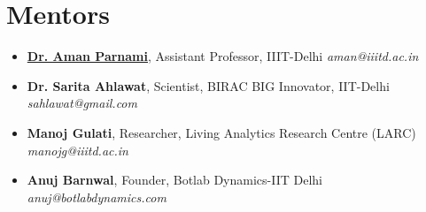 \documentclass[10pt]{report}
\begin{document}
\section*{\color{BlueViolet}\faUsers\hspace{1pt} Mentors}
\begin{itemize}
\vspace{-1em}\item\href{http://amanparnami.com/}{\color{black}\textbf{Dr. Aman Parnami}}, Assistant Professor, IIIT-Delhi
\hfill\textit{aman@iiitd.ac.in}  

\item\textbf{Dr. Sarita Ahlawat}, Scientist, BIRAC BIG Innovator, IIT-Delhi
\hfill\textit{sahlawat@gmail.com} 

\item\textbf{Manoj Gulati}, Researcher, Living Analytics Research Centre (LARC)
\hfill\textit{manojg@iiitd.ac.in}  

\item\textbf{Anuj Barnwal}, Founder, Botlab Dynamics-IIT Delhi
\hfill\textit{anuj@botlabdynamics.com} 
\end{itemize}
\\%
\end{document}

